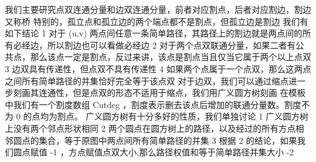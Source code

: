 {}\markdownRendererInterblockSeparator
{}
\markdownRendererSectionEnd 
\markdownRendererSectionEnd \markdownRendererSectionBegin
{}\markdownRendererInterblockSeparator
{}我们主要研究点双连通分量和边双连通分量，前者对应割点，后者对应割边，割边又称桥\markdownRendererParagraphSeparator
{}特别的，孤立点和孤立边的两个端点都不是割点，但孤立边是割边\markdownRendererParagraphSeparator
{}我们有如下结论\markdownRendererParagraphSeparator
{}\markdownRendererDollarSign{} 1 \markdownRendererDollarSign{}对于\markdownRendererDollarSign{} (u,v) \markdownRendererDollarSign{}两点间任意一条简单路径，其路径上的割边就是两点间的所有必经边，所以割边也可以看做必经边\markdownRendererParagraphSeparator
{}\markdownRendererDollarSign{} 2 \markdownRendererDollarSign{}对于两个点双联通分量，如果二者有公共点，那么该点一定是割点，反过来讲，该点是割点当且仅当它属于两个以上点双\markdownRendererParagraphSeparator
{}\markdownRendererDollarSign{} 3 \markdownRendererDollarSign{}边双具有传递性，但点双不具有传递性\markdownRendererParagraphSeparator
{}\markdownRendererDollarSign{} 4 \markdownRendererDollarSign{}如果两个点属于一个点双，那么这两点之间所有简单路径的并集恰好完全等于该点双\markdownRendererParagraphSeparator
{}对于边双，我们可以通过缩点进一步刻画其连通性，但是点双的形态不适用于缩点，我们用广义圆方树刻画\markdownRendererInterblockSeparator
{}\markdownRendererSectionBegin
{}\markdownRendererInterblockSeparator
{}在模板中我们有一个割度数组\markdownRendererDollarSign{} Cutdeg \markdownRendererDollarSign{}，割度表示删去该点后增加的联通分量数。割度不为\markdownRendererDollarSign{} 0 \markdownRendererDollarSign{}的点均为割点。\markdownRendererInterblockSeparator
{}\markdownRendererInterblockSeparator
{}广义圆方树有十分多好的性质，我们单独讨论\markdownRendererParagraphSeparator
{}\markdownRendererDollarSign{} 1 \markdownRendererDollarSign{}广义圆方树上没有两个邻点形状相同\markdownRendererParagraphSeparator
{}\markdownRendererDollarSign{} 2 \markdownRendererDollarSign{}两个圆点在圆方树上的路径，以及经过的所有方点相邻圆点的集合，等于原图中两点间所有简单路径的并集\markdownRendererParagraphSeparator
{}\markdownRendererDollarSign{} 3 \markdownRendererDollarSign{}根据\markdownRendererDollarSign{} 2 \markdownRendererDollarSign{}的结论，如果我们圆点赋值\markdownRendererDollarSign{} -1 \markdownRendererDollarSign{}，方点赋值点双大小,那么路径权值和等于简单路径并集大小\markdownRendererDollarSign{} -2 \markdownRendererDollarSign{}\markdownRendererInterblockSeparator
